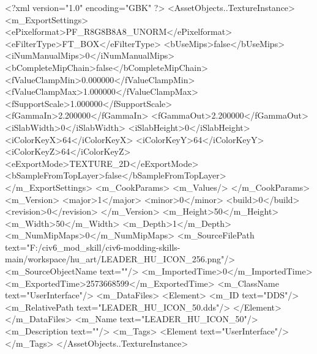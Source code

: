 <?xml version="1.0" encoding="GBK" ?>
<AssetObjects..TextureInstance>
	<m_ExportSettings>
		<ePixelformat>PF_R8G8B8A8_UNORM</ePixelformat>
		<eFilterType>FT_BOX</eFilterType>
		<bUseMips>false</bUseMips>
		<iNumManualMips>0</iNumManualMips>
		<bCompleteMipChain>false</bCompleteMipChain>
		<fValueClampMin>0.000000</fValueClampMin>
		<fValueClampMax>1.000000</fValueClampMax>
		<fSupportScale>1.000000</fSupportScale>
		<fGammaIn>2.200000</fGammaIn>
		<fGammaOut>2.200000</fGammaOut>
		<iSlabWidth>0</iSlabWidth>
		<iSlabHeight>0</iSlabHeight>
		<iColorKeyX>64</iColorKeyX>
		<iColorKeyY>64</iColorKeyY>
		<iColorKeyZ>64</iColorKeyZ>
		<eExportMode>TEXTURE_2D</eExportMode>
		<bSampleFromTopLayer>false</bSampleFromTopLayer>
	</m_ExportSettings>
	<m_CookParams>
		<m_Values/>
	</m_CookParams>
	<m_Version>
		<major>1</major>
		<minor>0</minor>
		<build>0</build>
		<revision>0</revision>
	</m_Version>
	<m_Height>50</m_Height>
	<m_Width>50</m_Width>
	<m_Depth>1</m_Depth>
	<m_NumMipMaps>0</m_NumMipMaps>
	<m_SourceFilePath text="F:/civ6_mod_skill/civ6-modding-skills-main/workspace/hu_art/LEADER_HU_ICON_256.png"/>
	<m_SourceObjectName text=""/>
	<m_ImportedTime>0</m_ImportedTime>
	<m_ExportedTime>2573668599</m_ExportedTime>
	<m_ClassName text="UserInterface"/>
	<m_DataFiles>
		<Element>
			<m_ID text="DDS"/>
			<m_RelativePath text="LEADER_HU_ICON_50.dds"/>
		</Element>
	</m_DataFiles>
	<m_Name text="LEADER_HU_ICON_50"/>
	<m_Description text=""/>
	<m_Tags>
		<Element text="UserInterface"/>
	</m_Tags>
</AssetObjects..TextureInstance>
